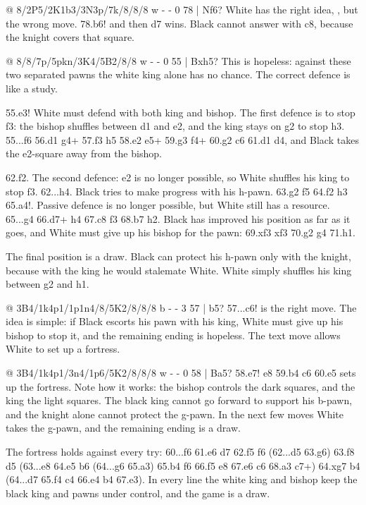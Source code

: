 @ 8/2P5/2K1b3/3N3p/7k/8/8/8 w - - 0 78 | Nf6?
White has the right idea, , but the wrong move.
78.\N b6! and then \N d7 wins. Black cannot answer with \B c8, because the knight covers that
square.

@ 8/8/7p/5pkn/3K4/5B2/8/8 w - - 0 55 | Bxh5?
This is hopeless: against these two separated pawns the white king alone has no chance. The
correct defence is like a study.

55.\K e3! White must defend with both king and bishop. The first defence is to stop f3: the bishop
shuffles between d1 and e2, and the king stays on g2 to stop h3. 55...\N f6 56.\B d1 \N g4+
57.\K f3 h5 58.\B e2 \N e5+ 59.\K g3 f4+ 60.\K g2 \N c6 61.\B d1 \N d4, and Black takes the e2-square
away from the bishop.

62.\K f2. The second defence: \B e2 is no longer possible, so White shuffles his king to stop f3.
62...h4. Black tries to make progress with his h-pawn. 63.\K g2 \K f5 64.\K f2 h3 65.\B a4!.
Passive defence is no longer possible, but White still has a resource. 65...\K g4 66.\B d7+ \K h4
67.\B c8 f3 68.\B b7 h2. Black has improved his position as far as it goes, and White must give
up his bishop for the pawn: 69.\B xf3 \N xf3 70.\K g2 \K g4 71.\K h1.

The final position is a draw. Black can
protect his h-pawn only with the knight, because with the king he would stalemate White. White
simply shuffles his king between g2 and h1.

@ 3B4/1k4p1/1p1n4/8/5K2/8/8/8 b - - 3 57 | b5?
57...\K c6! is the right move. The idea is simple: if Black escorts his pawn with his king, White
must give up his bishop to stop it, and the remaining ending is hopeless. The text move allows
White to set up a fortress.

@ 3B4/1k4p1/3n4/1p6/5K2/8/8/8 w - - 0 58 | Ba5?
58.\B e7! \N e8 59.\B b4 \K c6 60.\K e5 sets up the fortress. Note how it works: the bishop controls
the dark squares, and the king the light squares. The black king cannot go forward
to support his b-pawn, and the knight alone cannot protect the g-pawn. In the next few moves White
takes the g-pawn, and the remaining ending is a draw.

The fortress holds against every try: 60...\N f6 61.\K e6 \N d7 62.\K f5 \N f6 (62...\K d5 63.\K g6) 63.\B f8 \K d5 (63...\N e8
64.\K e5 \K b6 (64...g6 65.\B a3) 65.\B b4 \N f6 66.\K f5 \N e8 67.\K e6 \K c6 68.\B a3 \N c7+)
64.\B xg7 b4 (64...\N d7 65.\K f4 \K c4 66.\K e4 b4 67.\K e3). In every line the
white king and bishop keep the black king and pawns under control, and the game is a draw.

